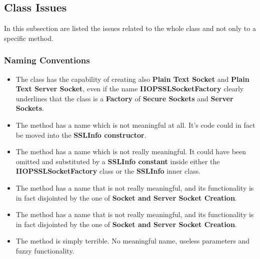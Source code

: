 \subsection{Class Issues}
In this subsection are listed the issues related to the whole class and not only to a specific method.
\subsubsection{Naming Conventions}
\begin{itemize}
		\begin{itemize}
			\item
				The class has the capability of creating also \textbf{Plain Text Socket} and \textbf{Plain Text Server Socket}, even if the name \textbf{IIOPSSLSocketFactory} clearly underlines that the class is a \textbf{Factory} of \textbf{Secure Sockets} and \textbf{Server Sockets}.
			\item
				The method
				has a name which is not meaningful at all.
				It's code could in fact be moved into the \textbf{SSLInfo constructor}.
			\item
				The method
				has a name which is not really meaningful.
				It could have been omitted and substituted by a \textbf{SSLInfo constant} inside either the \textbf{IIOPSSLSocketFactory} class or the \textbf{SSLInfo} inner class.
			\item
				The method
				has a name that is not really meaningful, and its functionality is in fact disjointed by the one of \textbf{Socket and Server Socket Creation}.
			\item
				The method 
				has a name that is not really meaningful, and its functionality is in fact disjointed by the one of \textbf{Socket and Server Socket Creation}.
			\item
				The method
				is simply terrible.
				No meaningful name, useless parameters and fuzzy functionality.
		\end{itemize}

\end{itemize}
